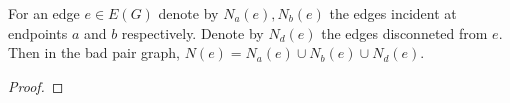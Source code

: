 



For an edge $e \in E(G)$ denote by $N_a(e), N_b(e)$ the edges incident at endpoints $a$ and $b$ respectively.  Denote by $N_d(e)$ the edges disconneted from $e$.  Then in the bad pair graph, $N(e) = N_a(e) \cup N_b(e) \cup N_d(e)$.

\begin{proof}

\end{proof}


